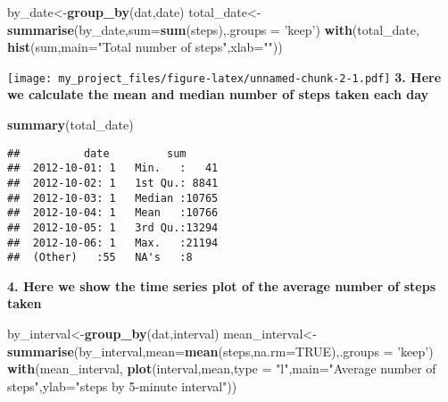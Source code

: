 \documentclass[]{article}
\newenvironment{Shaded}{\begin{snugshade}}{\end{snugshade}}
\newcommand{\DataTypeTok}[1]{\textcolor[rgb]{0.13,0.29,0.53}{#1}}
\newcommand{\KeywordTok}[1]{\textcolor[rgb]{0.13,0.29,0.53}{\textbf{#1}}}
\newcommand{\NormalTok}[1]{#1}
\newcommand{\OtherTok}[1]{\textcolor[rgb]{0.56,0.35,0.01}{#1}}
\newcommand{\StringTok}[1]{\textcolor[rgb]{0.31,0.60,0.02}{#1}}
\begin{document}
\begin{Shaded}
\begin{Highlighting}[]
\NormalTok{by_date<-}\KeywordTok{group_by}\NormalTok{(dat,date)}
\NormalTok{total_date<-}\KeywordTok{summarise}\NormalTok{(by_date,}\DataTypeTok{sum=}\KeywordTok{sum}\NormalTok{(steps),}\DataTypeTok{.groups =} \StringTok{'keep'}\NormalTok{)}
\KeywordTok{with}\NormalTok{(total_date, }\KeywordTok{hist}\NormalTok{(sum,}\DataTypeTok{main=}\StringTok{"Total number of steps"}\NormalTok{,}\DataTypeTok{xlab=}\StringTok{""}\NormalTok{))}
\end{Highlighting}
\end{Shaded}

\texttt{[image: my\_project\_files/figure-latex/unnamed-chunk-2-1.pdf]}
\textbf{3. Here we calculate the mean and median number of steps taken
each day}

\begin{Shaded}
\begin{Highlighting}[]
\KeywordTok{summary}\NormalTok{(total_date)}
\end{Highlighting}
\end{Shaded}

\begin{verbatim}
##          date         sum       
##  2012-10-01: 1   Min.   :   41  
##  2012-10-02: 1   1st Qu.: 8841  
##  2012-10-03: 1   Median :10765  
##  2012-10-04: 1   Mean   :10766  
##  2012-10-05: 1   3rd Qu.:13294  
##  2012-10-06: 1   Max.   :21194  
##  (Other)   :55   NA's   :8
\end{verbatim}

\textbf{4. Here we show the time series plot of the average number of
steps taken}

\begin{Shaded}
\begin{Highlighting}[]
\NormalTok{by_interval<-}\KeywordTok{group_by}\NormalTok{(dat,interval)}
\NormalTok{mean_interval<-}\KeywordTok{summarise}\NormalTok{(by_interval,}\DataTypeTok{mean=}\KeywordTok{mean}\NormalTok{(steps,}\DataTypeTok{na.rm=}\OtherTok{TRUE}\NormalTok{),}\DataTypeTok{.groups =} \StringTok{'keep'}\NormalTok{)}
\KeywordTok{with}\NormalTok{(mean_interval, }\KeywordTok{plot}\NormalTok{(interval,mean,}\DataTypeTok{type =} \StringTok{"l"}\NormalTok{,}\DataTypeTok{main=}\StringTok{"Average number of steps"}\NormalTok{,}\DataTypeTok{ylab=}\StringTok{"steps by 5-minute interval"}\NormalTok{))}
\end{Highlighting}
\end{Shaded}
\end{document}
